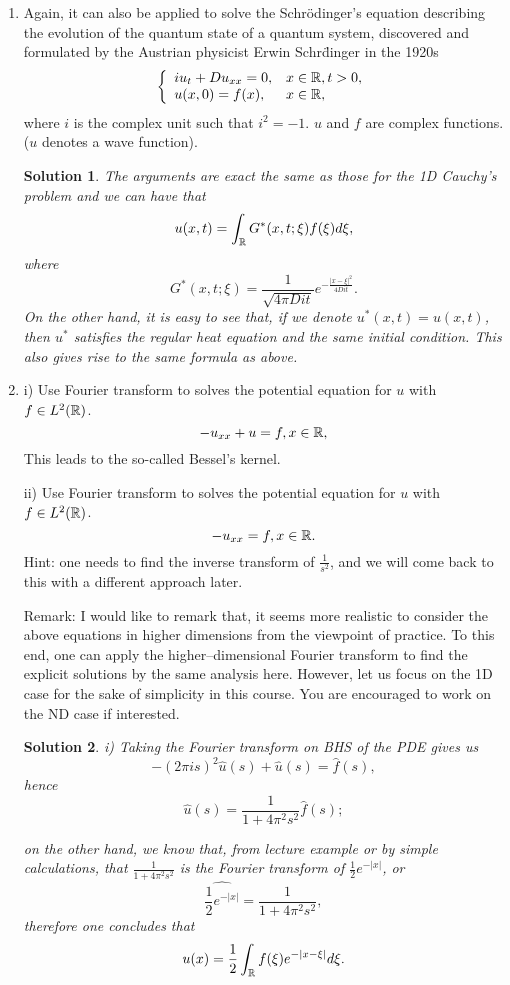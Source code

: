 \documentclass[6pt]{article}
\newtheorem{solution}{Solution}
\numberwithin{equation}{section}
\def\mathbb{\Bbb}
\begin{document}
\begin{enumerate}
\item Again, it can also be applied to solve the Schr\"odinger's equation describing the evolution of the quantum state of a quantum system, discovered and formulated by the Austrian physicist Erwin Schr\"dinger in the 1920s
    \[
\left\{
\begin{array}{ll}
iu_{t}+Du_{xx}=0,&x\in \mathbb R,t>0,\\
u(x,0)=f(x),&x\in \mathbb R,\\
\end{array}
\right.
\]
where $i$ is the complex unit such that $i^2=-1$.  $u$ and $f$ are complex functions. ($u$ denotes a wave function).
\begin{solution}
The arguments are exact the same as those for the 1D Cauchy's problem and we can have that
\[u(x,t)=\int_{\mathbb R}G^*(x,t;\xi)f(\xi)d\xi,\]
where
\[G^*(x,t;\xi)=\frac{1}{\sqrt{4\pi Dit}}e^{-\frac{\vert x-\xi\vert^2}{4Dit}}.\]
On the other hand, it is easy to see that, if we denote $u^*(x,t)=u(x,t)$, then $u^*$ satisfies the regular heat equation and the same initial condition.  This also gives rise to the same formula as above.
\end{solution}


\item
i) Use Fourier transform to solves the potential equation for $u$ with $f\in L^2(\mathbb R)$.
\[-u_{xx}+u=f,x\in \mathbb R,\]
This leads to the so-called Bessel's kernel.

ii) Use Fourier transform to solves the potential equation for $u$ with $f\in L^2(\mathbb R)$.
\[-u_{xx}=f,x\in \mathbb R.\]
Hint: one needs to find the inverse transform of $\frac{1}{s^2}$, and we will come back to this with a different approach later.

Remark:  I would like to remark that, it seems more realistic to consider the above equations in higher dimensions from the viewpoint of practice.  To this end, one can apply the higher--dimensional Fourier transform to find the explicit solutions by the same analysis here.  However, let us focus on the 1D case for the sake of simplicity in this course.  You are encouraged to work on the ND case if interested.
\begin{solution}
i) Taking the Fourier transform on BHS of the PDE gives us
\[-(2\pi i s)^2 \hat u(s)+\hat u(s)=\hat f(s),\]
hence
\[\hat u(s)=\frac{1}{1+4\pi^2 s^2}\hat f(s);\]

on the other hand, we know that, from lecture example or by simple calculations, that $\frac{1}{1+4\pi^2 s^2}$ is the Fourier transform of $\frac{1}{2}e^{-|x|}$, or
\[\widehat {\frac{1}{2}e^{-|x|}}=\frac{1}{1+4\pi^2 s^2},\]
therefore one concludes that
\[u(x)=\frac{1}{2}\int_\mathbb R f(\xi)  e^{-|x-\xi|}d\xi.\]


\end{solution}
\end{enumerate}
\end{document}
